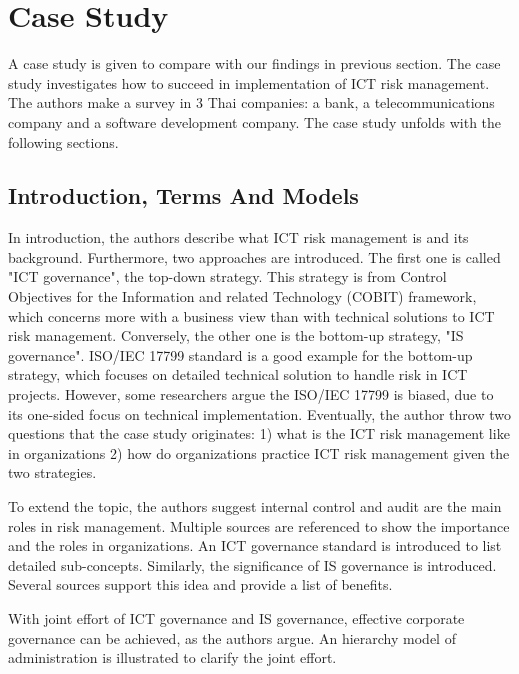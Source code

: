 
\section{Case Study}

A case study  is given to compare with our findings in previous section. The case study investigates how to succeed in implementation of ICT risk management. The authors\parencite{case_study} make a survey in 3 Thai companies: a bank, a telecommunications company and a software development company. The case study unfolds with the following sections.

\subsection{Introduction, Terms And Models}

In introduction, the authors describe what ICT risk management is and its background. Furthermore, two approaches are introduced. The first one is called "ICT governance", the top-down strategy. This strategy is from Control Objectives for the Information and related Technology (COBIT) framework, which concerns more with a business view than with technical solutions to ICT risk management. Conversely, the other one is the bottom-up strategy, "IS governance". ISO/IEC 17799 standard is a good example for the bottom-up strategy, which focuses on detailed technical solution to handle risk in ICT projects. However, some researchers argue the ISO/IEC 17799 is biased, due to its one-sided focus on technical implementation. Eventually, the author throw two questions that the case study originates: 1) what is the ICT risk management like in organizations 2) how do organizations practice ICT risk management given the two strategies.

To extend the topic, the authors suggest internal control and audit are the main roles in risk management. Multiple sources are referenced to show the importance and the roles in organizations. An ICT governance standard is introduced to list detailed sub-concepts. Similarly, the significance of IS governance is introduced. Several sources support this idea and provide a list of benefits.

With joint effort of ICT governance and IS governance, effective corporate governance can be achieved, as the authors argue. An hierarchy model of administration is illustrated to clarify the joint effort.

